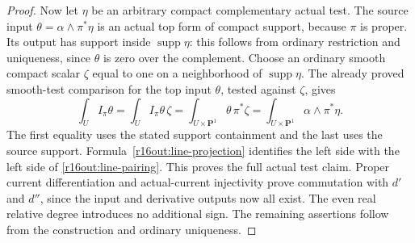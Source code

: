 \begin{proof}
Now let $\eta$ be an arbitrary compact complementary actual test.
The source input $\theta=\alpha\wedge\pi^*\eta$ is an actual top
form of compact support, because $\pi$ is proper.  Its output has
support inside $\operatorname{supp}\eta$: this follows from ordinary
restriction and uniqueness, since $\theta$ is zero over the
complement.  Choose an ordinary smooth compact scalar $\zeta$ equal
to one on a neighborhood of $\operatorname{supp}\eta$.  The already
proved smooth-test comparison for the top input $\theta$, tested
against $\zeta$, gives
\[
 \int_U I_\pi\theta
   =\int_U I_\pi\theta\,\zeta
   =\int_{U\times\mathbf P^1}\theta\,\pi^*\zeta
   =\int_{U\times\mathbf P^1}\alpha\wedge\pi^*\eta.
\]
The first equality uses the stated support containment and the last
uses the source support.  Formula~\eqref{r16out:line-projection}
identifies the left side with the left side of
\eqref{r16out:line-pairing}.  This proves the full actual test claim.
Proper current differentiation and actual-current injectivity prove
commutation with $d'$ and $d''$, since the input and derivative
outputs now all exist.  The even real relative degree introduces
no additional sign.  The remaining assertions follow from the
construction and ordinary uniqueness.
\end{proof}

